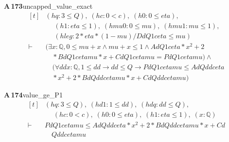 \documentclass[conference]{IEEEtran}
\theoremstyle{definition}
\newcommand{\lean}[1]{\textsf{\footnotesize #1}}
\begin{document}
\noindent\textbf{A\,173}\quad\lean{uncapped\_value\_exact}
{\footnotesize\[ \begin{aligned}[t]
&(\mathit{hq} : 3 \leq \mathit{Q}),\; (\mathit{hc} : 0 < \mathit{c}),\; (\mathit{h0} : 0 \leq \mathit{eta}),\\
&\quad \; (\mathit{h1} : \mathit{eta} \leq 1),\; (\mathit{hmu0} : 0 \leq \mathit{mu}),\; (\mathit{hmu1} : \mathit{mu} \leq 1),\\
&\quad \; (\mathit{hleg} : 2 * \mathit{eta} * (1 - \mathit{mu}) / \mathit{Dd} \mathit{Q} 1 \mathit{c} \mathit{eta} \leq \mathit{mu})\\
\vdash\;&(\exists \mathit{x} : \mathbb{Q} , 0 \leq \mathit{mu} + \mathit{x} \wedge \mathit{mu} + \mathit{x} \leq 1 \wedge \mathit{Ad} \mathit{Q} 1 \mathit{c} \mathit{eta} * \mathit{x} ^{2} + 2\\
&\quad * \mathit{Bd} \mathit{Q} 1 \mathit{c} \mathit{eta} \mathit{mu} * \mathit{x} + \mathit{Cd} \mathit{Q} 1 \mathit{c} \mathit{eta} \mathit{mu} = \mathit{Pd} \mathit{Q} 1 \mathit{c} \mathit{eta} \mathit{mu}) \wedge\\
&\quad (\forall \mathit{dd} \mathit{x} : \mathbb{Q} , 1 \leq \mathit{dd} \to \mathit{dd} \leq \mathit{Q} \to \mathit{Pd} \mathit{Q} 1 \mathit{c} \mathit{eta} \mathit{mu} \leq \mathit{Ad} \mathit{Q} \mathit{dd} \mathit{c} \mathit{eta}\\
&\quad * \mathit{x} ^{2} + 2 * \mathit{Bd} \mathit{Q} \mathit{dd} \mathit{c} \mathit{eta} \mathit{mu} * \mathit{x} + \mathit{Cd} \mathit{Q} \mathit{dd} \mathit{c} \mathit{eta} \mathit{mu})
\end{aligned} \]}

\noindent\textbf{A\,174}\quad\lean{value\_ge\_P1}
{\footnotesize\[ \begin{aligned}[t]
&(\mathit{hq} : 3 \leq \mathit{Q}),\; (\mathit{hd1} : 1 \leq \mathit{dd}),\; (\mathit{hdq} : \mathit{dd} \leq \mathit{Q}),\\
&\quad \; (\mathit{hc} : 0 < \mathit{c}),\; (\mathit{h0} : 0 \leq \mathit{eta}),\; (\mathit{h1} : \mathit{eta} \leq 1),\; (\mathit{x} : \mathbb{Q} )\\
\vdash\;&\mathit{Pd} \mathit{Q} 1 \mathit{c} \mathit{eta} \mathit{mu} \leq \mathit{Ad} \mathit{Q} \mathit{dd} \mathit{c} \mathit{eta} * \mathit{x} ^{2} + 2 * \mathit{Bd} \mathit{Q} \mathit{dd} \mathit{c} \mathit{eta} \mathit{mu} * \mathit{x} + \mathit{Cd}\\
&\quad \mathit{Q} \mathit{dd} \mathit{c} \mathit{eta} \mathit{mu}
\end{aligned} \]}
\end{document}

